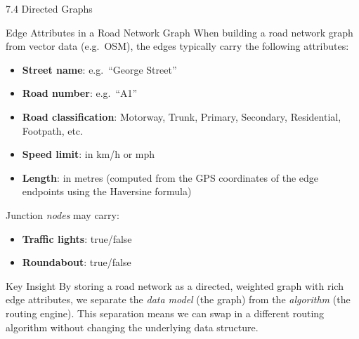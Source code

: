 \documentclass[aspectratio=169,10pt]{beamer}
\begin{document}
\begin{frame}[allowframebreaks]{7.4 Directed Graphs}
  \framebreak

  \begin{block}{Edge Attributes in a Road Network Graph}
    When building a road network graph from vector data (e.g.\ OSM),
    the edges typically carry the following attributes:
    \begin{itemize}
      \item \textbf{Street name}: e.g.\ ``George Street''
      \item \textbf{Road number}: e.g.\ ``A1''
      \item \textbf{Road classification}: Motorway, Trunk, Primary,
            Secondary, Residential, Footpath, etc.
      \item \textbf{Speed limit}: in km/h or mph
      \item \textbf{Length}: in metres (computed from the GPS coordinates
            of the edge endpoints using the Haversine formula)
    \end{itemize}
    Junction \emph{nodes} may carry:
    \begin{itemize}
      \item \textbf{Traffic lights}: true/false
      \item \textbf{Roundabout}: true/false
    \end{itemize}
  \end{block}

  \begin{alertblock}{Key Insight}
    By storing a road network as a directed, weighted graph with
    rich edge attributes, we separate the \emph{data model}
    (the graph) from the \emph{algorithm} (the routing engine).
    This separation means we can swap in a different routing
    algorithm without changing the underlying data structure.
  \end{alertblock}

\end{frame}
\end{document}
